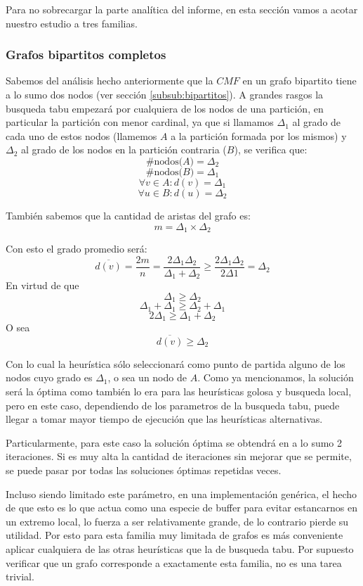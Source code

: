 Para no sobrecargar la parte anal\'itica del informe, en esta 
secci\'on vamos a acotar nuestro estudio a tres familias.

\subsubsection{Grafos bipartitos completos}

Sabemos del an\'alisis hecho anteriormente que la $CMF$ en un
grafo bipartito tiene a lo sumo dos nodos 
(ver secci\'on \ref{subsub:bipartitos}).
A grandes rasgos la busqueda tabu empezar\'a por cualquiera
de los nodos de una partici\'on, en particular la partici\'on
con menor cardinal, ya que si llamamos $\Delta_1$ al grado 
de cada uno de estos nodos (llamemos $A$ a la partici\'on formada
por los mismos) y $\Delta_2$ al grado de los nodos
en la partici\'on contraria ($B$), se verifica que:
\[ \text{\#nodos($A$)}= \Delta_2 \]
\[ \text{\#nodos($B$)}= \Delta_1 \]
\[ \forall v \in A: d(v)= \Delta_1 \]
\[ \forall u \in B: d(u)= \Delta_2 \]

Tambi\'en sabemos que la cantidad de aristas del grafo es:
\[ m = \Delta_1 \times \Delta_2 \]

Con esto el grado promedio ser\'a:
\[ \overline{d(v)} = \frac{2m}{n} = \frac{2 \Delta_1 \Delta_2}
{\Delta_1 + \Delta_2} \geq \frac{2 \Delta_1 \Delta_2}{2 \Delta1} 
= \Delta_2 \]
En virtud de que
\[ \Delta_1 \geq \Delta_2 \]
\[ \Delta_1 + \Delta_1 \geq \Delta_2 + \Delta_1 \]
\[ 2 \Delta_1 \geq \Delta_1 + \Delta_2 \]
O sea
\[ \overline{d(v)} \geq \Delta_2 \]

Con lo cual la heur\'istica s\'olo seleccionar\'a como 
punto de partida alguno de los nodos cuyo grado es $\Delta_1$, 
o sea un nodo de $A$. Como ya mencionamos, la soluci\'on ser\'a
la \'optima como tambi\'en lo era para las heur\'isticas golosa
y busqueda local, pero en este caso, dependiendo de los 
parametros de la busqueda tabu, puede llegar a tomar mayor 
tiempo de ejecuci\'on que las heur\'isticas alternativas.

Particularmente, para este caso la soluci\'on \'optima se 
obtendr\'a en a lo sumo 2 iteraciones. Si es muy alta la
cantidad de iteraciones sin mejorar que se permite, se 
puede pasar por todas las soluciones \'optimas repetidas 
veces.

Incluso siendo limitado este par\'ametro, en una implementaci\'on
gen\'erica, el hecho de que esto es lo que actua como una especie
de buffer para evitar estancarnos en un extremo local, 
lo fuerza a ser relativamente
grande, de lo contrario pierde su utilidad. Por esto para esta familia
muy limitada de grafos es m\'as conveniente aplicar cualquiera de las
otras heur\'isticas que la de busqueda tabu. Por supuesto verificar 
que un grafo corresponde a exactamente esta familia, no es una
tarea trivial.

